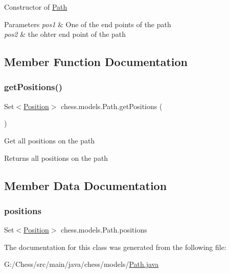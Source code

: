 Constructor of \mbox{\hyperlink{classchess_1_1models_1_1_path}{Path}}


\begin{DoxyParams}{Parameters}
{\em pos1} & One of the end points of the path \\
\hline
{\em pos2} & the ohter end point of the path \\
\hline
\end{DoxyParams}


\subsection{Member Function Documentation}
\mbox{\label{classchess_1_1models_1_1_path_adce43d0b62fd3ba9d7ac261fcf4cf7b1}} 
\subsubsection{\texorpdfstring{get\+Positions()}{getPositions()}}
{\footnotesize\ttfamily Set$<$\mbox{\hyperlink{classchess_1_1models_1_1_position}{Position}}$>$ chess.\+models.\+Path.\+get\+Positions (\begin{DoxyParamCaption}{ }\end{DoxyParamCaption})}

Get all positions on the path

\begin{DoxyReturn}{Returns}
all positions on the path 
\end{DoxyReturn}


\subsection{Member Data Documentation}
\mbox{\label{classchess_1_1models_1_1_path_abfd1faa7caf599ad3d8a2a0fa03ee883}} 
\subsubsection{\texorpdfstring{positions}{positions}}
{\footnotesize\ttfamily Set$<$\mbox{\hyperlink{classchess_1_1models_1_1_position}{Position}}$>$ chess.\+models.\+Path.\+positions\hspace{0.3cm}{\ttfamily [private]}}



The documentation for this class was generated from the following file\+:\begin{DoxyCompactItemize}
\item 
G\+:/\+Chess/src/main/java/chess/models/\mbox{\hyperlink{_path_8java}{Path.\+java}}\end{DoxyCompactItemize}

